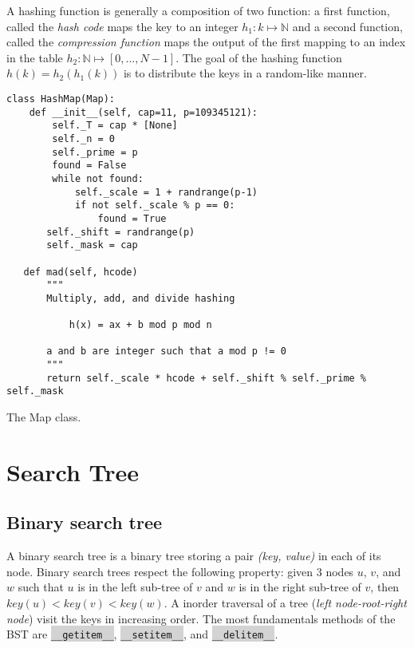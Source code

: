 \documentclass[10pt]{article}
\newcommand{\code}[1]{{\small\colorbox{LightGray}{\texttt{#1}}}}
\begin{document}
A hashing function is generally a composition of two function: a first function, called the \textit{hash code} maps the key to an integer $h_1\colon k \mapsto \mathbb{N}$ and a second function, called the \emph{compression function} maps the output of the first mapping to an index in the table $h_2\colon \mathbb{N}\mapsto [0,...,N-1]$. The goal of the hashing function $h(k)=h_2(h_1(k))$ is to distribute the keys in a random-like manner.

\begin{listing}[ht]
\begin{verbatim}
class HashMap(Map):
    def __init__(self, cap=11, p=109345121):
        self._T = cap * [None]
        self._n = 0
        self._prime = p
        found = False
        while not found:
            self._scale = 1 + randrange(p-1)
            if not self._scale % p == 0:
                found = True
       self._shift = randrange(p)
       self._mask = cap
       
   def mad(self, hcode)
       """
       Multiply, add, and divide hashing
       
           h(x) = ax + b mod p mod n
       
       a and b are integer such that a mod p != 0
       """
       return self._scale * hcode + self._shift % self._prime % self._mask
\end{verbatim}
\caption{The Map class.}
\label{listing:hashMap}
\end{listing}

\section{Search Tree}

\subsection{Binary search tree}
A binary search tree is a binary tree storing a pair \emph{(key, value)} in each of its node. Binary search trees respect the following property: given 3 nodes $u$, $v$, and $w$ such that $u$ is in the left sub-tree of $v$ and $w$ is in the right sub-tree of $v$, then $key(u)<key(v)<key(w)$. A inorder traversal of a tree (\emph{left node-root-right node}) visit the keys in increasing order. The most fundamentals methods of the BST are \code{\_\_getitem\_\_}, \code{\_\_setitem\_\_}, and \code{\_\_delitem\_\_}. \\
\end{document}
